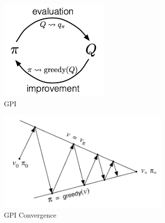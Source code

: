 \begin{table}[h]
    \begin{minipage}{0.35\linewidth}
        \begin{figure}[H]
            \centering
            \includegraphics[height=5cm,width=\linewidth,keepaspectratio]{Pictures/deep-reinforcement-learning/gpi-1.jpg}
            \caption{GPI}
        \end{figure}
    \end{minipage}
    \hfill
    \begin{minipage}{0.65\linewidth}
        \begin{figure}[H]
            \centering
            \includegraphics[height=5cm,width=\linewidth,keepaspectratio]{Pictures/deep-reinforcement-learning/gpi-2.jpg}
            \caption{GPI Convergence}
        \end{figure}
    \end{minipage}
\end{table}


